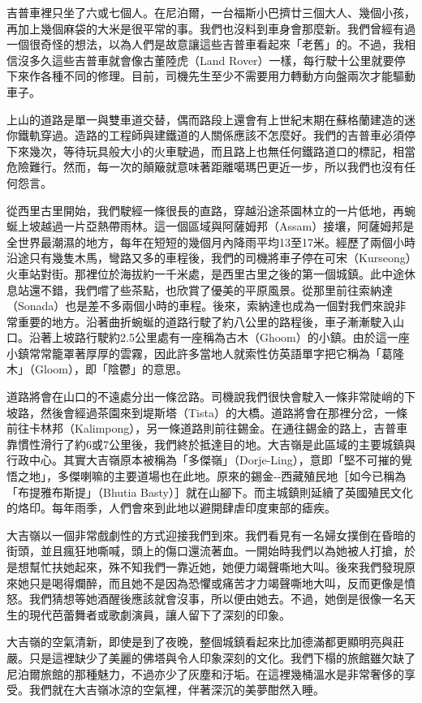 吉普車裡只坐了六或七個人。在尼泊爾，一台福斯小巴擠廿三個大人、幾個小孩，再加上幾個麻袋的大米是很平常的事。我們也沒料到車身會那麼新。我們曾經有過一個很奇怪的想法，以為人們是故意讓這些吉普車看起來「老舊」的。不過，我相信沒多久這些吉普車就會像古董陸虎（Land
Rover）一樣，每行駛十公里就要停下來作各種不同的修理。目前，司機先生至少不需要用力轉動方向盤兩次才能驅動車子。

上山的道路是單一與雙車道交替，偶而路段上還會有上世紀末期在蘇格蘭建造的迷你鐵軌穿過。造路的工程師與建鐵道的人關係應該不怎麼好。我們的吉普車必須停下來幾次，等待玩具般大小的火車駛過，而且路上也無任何鐵路道口的標記，相當危險難行。然而，每一次的顛簸就意味著距離噶瑪巴更近一步，所以我們也沒有任何怨言。

從西里古里開始，我們駛經一條很長的直路，穿越沿途茶園林立的一片低地，再蜿蜒上坡越過一片亞熱帶雨林。這一個區域與阿薩姆邦（Assam）接壤，阿薩姆邦是全世界最潮濕的地方，每年在短短的幾個月內降雨平均13至17米。經歷了兩個小時沿途只有幾隻木馬，彎路又多的車程後，我們的司機將車子停在可宋（Kurseong）火車站對街。那裡位於海拔約一千米處，是西里古里之後的第一個城鎮。此中途休息站還不錯，我們嚐了些茶點，也欣賞了優美的平原風景。從那里前往索納達（Sonada）也是差不多兩個小時的車程。後來，索納達也成為一個對我們來說非常重要的地方。沿著曲折蜿蜒的道路行駛了約八公里的路程後，車子漸漸駛入山口。沿著上坡路行駛約2.5公里處有一座稱為古木（Ghoom）的小鎮。由於這一座小鎮常常籠罩著厚厚的雲霧，因此許多當地人就索性仿英語單字把它稱為「葛隆木」（Gloom），即「陰鬱」的意思。

道路將會在山口的不遠處分出一條岔路。司機說我們很快會駛入一條非常陡峭的下坡路，然後會經過茶園來到堤斯塔（Tista）的大橋。道路將會在那裡分岔，一條前往卡林邦（Kalimpong），另一條道路則前往錫金。在通往錫金的路上，吉普車靠慣性滑行了約6或7公里後，我們終於抵達目的地。大吉嶺是此區域的主要城鎮與行政中心。其實大吉嶺原本被稱為「多傑嶺」（Dorje-Ling），意即「堅不可摧的覺悟之地」，多傑喇嘛的主要道場也在此地。原來的錫金-\/-西藏殖民地［如今已稱為「布提雅布斯提」（Bhutia
Basty）］就在山腳下。而主城鎮則延續了英國殖民文化的烙印。每年雨季，人們會來到此地以避開肆虐印度東部的瘧疾。

大吉嶺以一個非常戲劇性的方式迎接我們到來。我們看見有一名婦女撲倒在昏暗的街頭，並且瘋狂地嘶喊，頭上的傷口還流著血。一開始時我們以為她被人打搶，於是想幫忙扶她起來，殊不知我們一靠近她，她便力竭聲嘶地大叫。後來我們發現原來她只是喝得爛醉，而且她不是因為恐懼或痛苦才力竭聲嘶地大叫，反而更像是憤怒。我們猜想等她酒醒後應該就會沒事，所以便由她去。不過，她倒是很像一名天生的現代芭蕾舞者或歌劇演員，讓人留下了深刻的印象。

大吉嶺的空氣清新，即使是到了夜晚，整個城鎮看起來比加德滿都更顯明亮與莊嚴。只是這裡缺少了美麗的佛塔與令人印象深刻的文化。我們下榻的旅館雖欠缺了尼泊爾旅館的那種魅力，不過亦少了灰塵和汙垢。在這裡幾桶溫水是非常奢侈的享受。我們就在大吉嶺冰涼的空氣裡，伴著深沉的美夢酣然入睡。

